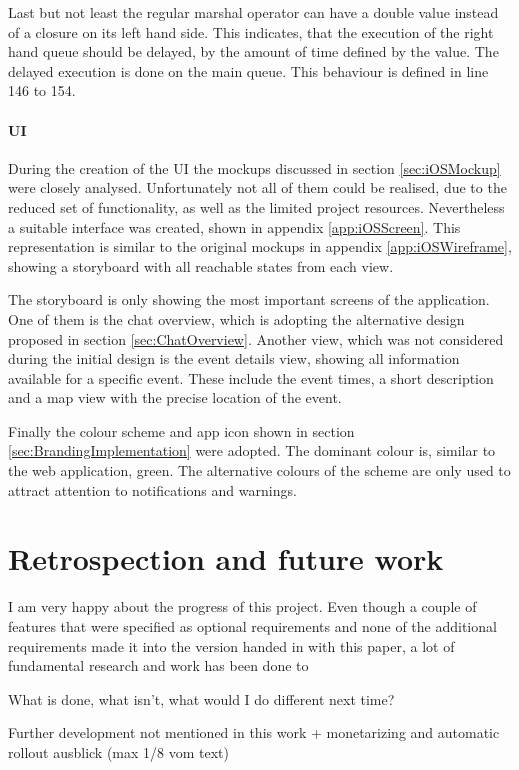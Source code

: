 Last but not least the regular marshal operator can have a double value instead of a closure on its left hand side. This indicates, that the execution of the right hand queue should be delayed, by the amount of time defined by the value. The delayed execution is done on the main queue. This behaviour is defined in line 146 to 154.

\subsubsection{UI}

During the creation of the \gls{UI} the mockups discussed in section \vref{sec:iOSMockup} were closely analysed. Unfortunately not all of them could be realised, due to the reduced set of functionality, as well as the limited project resources. Nevertheless a suitable interface was created, shown in appendix \vref{app:iOSScreen}. This representation is similar to the original mockups in appendix \vref{app:iOSWireframe}, showing a storyboard with all reachable states from each view. 

The storyboard is only showing the most important screens of the application. One of them is the chat overview, which is adopting the alternative design proposed in section \vref{sec:ChatOverview}. Another view, which was not considered during the initial design is the event details view, showing all information available for a specific event. These include the event times, a short description and a map view with the precise location of the event.

Finally the colour scheme and app icon shown in section \vref{sec:BrandingImplementation} were adopted. The dominant colour is, similar to the web application, green. The alternative colours of the scheme are only used to attract attention to notifications and warnings. 

\chapter{Retrospection and future work}
\label{chapter:OngoingWork}

I am very happy about the progress of this project. Even though a couple of features that were specified as optional requirements and none of the additional requirements made it into the version handed in with this paper, a lot of fundamental research and work has been done to 

What is done, what isn't, what would I do different next time?

Further development not mentioned in this work + monetarizing and automatic rollout
ausblick (max 1/8 vom text)

